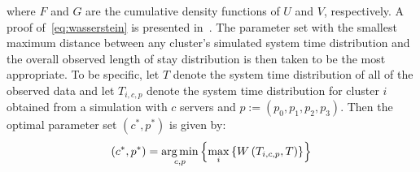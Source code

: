 \noindent where \(F\) and \(G\) are the cumulative density functions of \(U\)
and \(V\), respectively. A proof of~\eqref{eq:wasserstein} is presented
in~\cite{Ramdas2017}. The parameter set with the smallest maximum distance
between any cluster's simulated system time distribution and the overall
observed length of stay distribution is then taken to be the most appropriate.
To be specific, let \(T\) denote the system time distribution of all of the
observed data and let \(T_{i,c,p}\) denote the system time distribution for
cluster \(i\) obtained from a simulation with \(c\) servers and \(p :=
\left(p_0, p_1, p_2, p_3\right)\). Then the optimal parameter set \(\left(c^*,
p^*\right)\) is given by:
\begin{equation}\label{eq:parameters}
    \left(c^*, p^*\right) = \argmin_{c, p} \left\{%
        \max_{i} \left\{ W\left(T_{i,c,p}, T\right) \right\}%
    \right\}
\end{equation}

